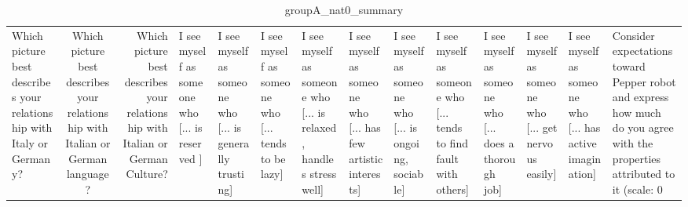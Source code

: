 \begin{table}
\caption{groupA_nat0_summary}
\label{tab:groupA_nat0_summary}
\begin{tabular}{lcr}
\toprule
Which picture best describes your relationship with Italy or Germany? & Which picture best describes your relationship with Italian or German language? & Which picture best describes your relationship with Italian or German Culture? & I see myself as someone who  [... is reserved ] & I see myself as someone who  [... is generally trusting] & I see myself as someone who  [... tends to be lazy] & I see myself as someone who  [... is relaxed, handles stress well] & I see myself as someone who  [... has few artistic interests] & I see myself as someone who  [... is ongoing, sociable] & I see myself as someone who  [... tends to find fault with others] & I see myself as someone who  [... does a thorough job] & I see myself as someone who  [... get nervous easily] & I see myself as someone who  [... has active imagination] & Consider expectations toward Pepper robot and express how much do you agree with the properties attributed to it (scale: 0%
\end{tabular}
\end{table}
